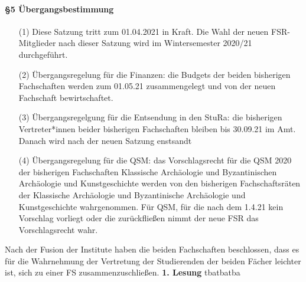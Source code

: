 {    \paragraph{§5 Übergangsbestimmung}
    \begin{enumerate}
        \item[(1)] Diese  Satzung  tritt  zum  01.04.2021  in  Kraft.  Die  Wahl  der  neuen  FSR-Mitglieder  nach dieser Satzung wird im Wintersemester 2020/21 durchgeführt.
        \item[(2)] Übergangsregelung  für  die  Finanzen:  die  Budgets  der  beiden  bisherigen  Fachschaften werden zum 01.05.21 zusammengelegt und von der neuen Fachschaft bewirtschaftet.
        \item[(3)] Übergangsregelgung für die Entsendung in den StuRa: die bisherigen Vertreter*innen beider bisherigen Fachschaften bleiben bis 30.09.21 im Amt. Danach wird nach der neuen Satzung enstsandt
        \item[(4)] Übergangsregelung  für  die  QSM:  das  Vorschlagsrecht  für  die  QSM  2020  der  bisherigen Fachschaften Klassische Archäologie und Byzantinischen Archäologie und Kunstgeschichte werden von den bisherigen Fachschaftsräten der Klassische Archäologie und Byzantinische Archäologie und Kunstgeschichte wahrgenommen. Für QSM, für die nach dem 1.4.21 kein Vorschlag vorliegt oder die zurückfließen nimmt der neue FSR das Vorschlagsrecht wahr.  
    \end{enumerate}
}{
    Nach der Fusion der Institute haben die beiden Fachschaften beschlossen, dass es für die Wahrnehmung der Vertretung der Studierenden der beiden Fächer leichter ist, sich zu einer FS zusammenzuschließen.
}{
    \textbf{1. Lesung}
    \ul{}
}{tba}{tba}{tba}